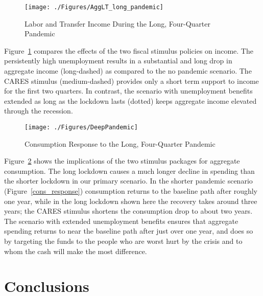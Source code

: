 \documentclass[titlepage,letterpaper]{\econtex}
\begin{document}
\begin{figure}
  \centering
  \caption{Labor and Transfer Income During the Long, Four-Quarter Pandemic}
  \label{inc_response_pandemic}
  { \texttt{[image: ./Figures/AggLT\_long\_pandemic]}}
\end{figure}

Figure~\ref{inc_response_pandemic} compares the effects of the two fiscal stimulus policies on income.
The persistently high unemployment results in a substantial and long drop in aggregate income (long-dashed) as compared to the no pandemic scenario.
The CARES stimulus (medium-dashed) provides only a short term support to income for the first two quarters.
In contrast, the scenario with unemployment benefits extended as long as the lockdown lasts (dotted) keeps aggregate income elevated through the recession.

\begin{figure}
  \centering
  \caption{Consumption Response to the Long, Four-Quarter Pandemic}
  \label{cons_response_pandemic}
  { \texttt{[image: ./Figures/DeepPandemic]}}
\end{figure}

Figure~\ref{cons_response_pandemic} shows the implications of the two stimulus packages for aggregate consumption.
The long lockdown causes a much longer decline in spending than the shorter lockdown in our primary scenario. In the shorter pandemic scenario (Figure~\ref{cons_response}) consumption returns to the baseline path after roughly one year, while in the long lockdown shown here the recovery takes around three years;
the CARES stimulus shortens the consumption drop to about two years.
The scenario with extended unemployment benefits ensures that aggregate spending returns to near the baseline path after just over one year, and does so by targeting the funds to the people who are worst hurt by the crisis and to whom the cash will make the most difference.

\section{Conclusions}
\end{document}
